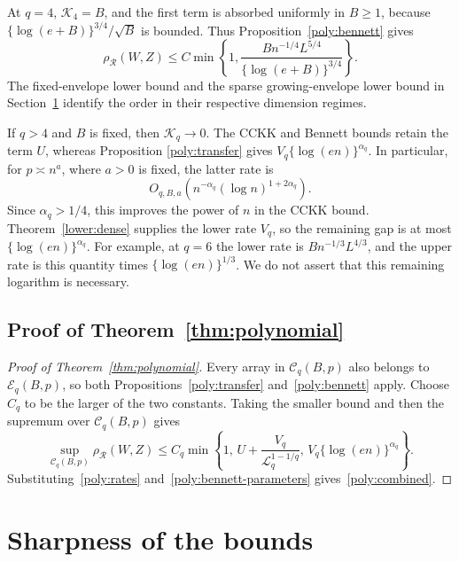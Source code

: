 \documentclass[11pt,letterpaper]{article}
\theoremstyle{remark}
\newcommand{\rh}{\rho_{\mathcal R}}
\begin{document}
At \(q=4\), \(\mathcal K_4=B\), and the first term is absorbed uniformly in
\(B\ge1\), because \(\{\log(e+B)\}^{3/4}/\sqrt B\) is bounded.
Thus Proposition~\ref{poly:bennett} gives
\begin{equation}
 \rh(W,Z)\le C\min\left\{1,
 \frac{Bn^{-1/4}L^{5/4}}{\{\log(e+B)\}^{3/4}}\right\}.
 \label{poly:q4}
\end{equation}
The fixed-envelope lower bound and the sparse growing-envelope lower
bound in Section~\ref{opt:section} identify the order in their respective
dimension regimes.

If \(q>4\) and \(B\) is fixed, then \(\mathcal K_q\to0\). The CCKK and
Bennett bounds retain the term \(U\), whereas Proposition
\ref{poly:transfer} gives \(V_q\{\log(en)\}^{\alpha_q}\). In particular, for
\(p\asymp n^a\), where \(a>0\) is fixed, the latter rate is
\[
 O_{q,B,a}\!\left(n^{-\alpha_q}(\log n)^{1+2\alpha_q}\right).
\]
Since \(\alpha_q>1/4\), this improves the power of \(n\) in the CCKK
bound. Theorem~\ref{lower:dense} supplies the lower rate \(V_q\), so
the remaining gap is at most \(\{\log(en)\}^{\alpha_q}\). For example, at
\(q=6\) the lower rate is \(Bn^{-1/3}L^{4/3}\), and the upper rate
is this quantity times \(\{\log(en)\}^{1/3}\). We do not assert that this
remaining logarithm is necessary.

\subsection{Proof of Theorem~\ref*{thm:polynomial}}\label{sec:proof-theorem-two}

\begin{proof}[Proof of Theorem~\ref{thm:polynomial}]
Every array in \(\mathcal C_q(B,p)\) also belongs to
\(\mathcal E_q(B,p)\), so both Propositions~\ref{poly:transfer}
and~\ref{poly:bennett} apply.
Choose \(C_q\) to be the larger of the two constants. Taking the
smaller bound and then the supremum over \(\mathcal C_q(B,p)\) gives
\[
 \sup_{\mathcal C_q(B,p)}\rh(W,Z)
 \le C_q\min\left\{1,\,
 U+\frac{V_q}{\mathcal L_q^{1-1/q}},\,
 V_q\{\log(en)\}^{\alpha_q}\right\}.
\]
Substituting~\eqref{poly:rates}
and~\eqref{poly:bennett-parameters} gives~\eqref{poly:combined}.
\end{proof}

\section{Sharpness of the bounds}\label{opt:section}
\end{document}
